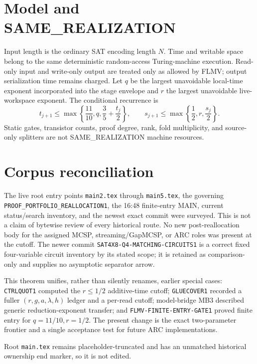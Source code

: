 \documentclass[11pt]{article}
\begin{document}
\section*{Model and SAME\_REALIZATION}
Input length is the ordinary SAT encoding length $N$.  Time and writable space
belong to the same deterministic random-access Turing-machine execution.
Read-only input and write-only output are treated only as allowed by FLMV;
output serialization time remains charged.  Let $q$ be the largest unavoidable
local-time exponent incorporated into the stage envelope and $r$ the largest
unavoidable live-workspace exponent.  The conditional recurrence is
\begin{equation}
 t_{j+1}\le
 \max\left\{\frac{11}{10},q,\frac35+\frac{t_j}{2}\right\},
 \qquad
 s_{j+1}\le
 \max\left\{\frac12,r,\frac{s_j}{2}\right\}.
 \tag{1}
\end{equation}
Static gates, transistor counts, proof degree, rank, fold multiplicity, and
source-only splitters are not SAME\_REALIZATION machine resources.

\section*{Corpus reconciliation}
The live root entry points \texttt{main2.tex} through \texttt{main5.tex}, the
governing \texttt{PROOF\_PORTFOLIO\_REALLOCATION1}, the 16:48 finite-entry
MAIN, current status/search inventory, and the newest exact commit were
surveyed.  This is not a claim of bytewise review of every historical route.
No new post-reallocation body for the assigned MCSP, streaming/GapMCSP, or ARC
roles was present at the cutoff.  The newer commit
\texttt{SAT4X8-Q4-MATCHING-CIRCUITS1} is a correct fixed four-variable circuit
inventory by its stated scope; it is retained as comparison-only and supplies
no asymptotic separator arrow.

This theorem unifies, rather than silently renames, earlier special cases:
\texttt{CTRLQUOT1} computed the $r\le1/2$ additive-time cutoff;
\texttt{GLUECOVER1} recorded a fuller $(r,g,a,\lambda,h)$ ledger and a per-read
cutoff; model-bridge MB3 described generic reduction-exponent transfer; and
\texttt{FLMV-FINITE-ENTRY-GATE1} proved finite entry for $q=11/10,r=1/2$.
The present change is the exact two-parameter frontier and a single acceptance
test for future ARC implementations.

Root \texttt{main.tex} remains placeholder-truncated and has an unmatched
historical ownership end marker, so it is not edited.
\end{document}
